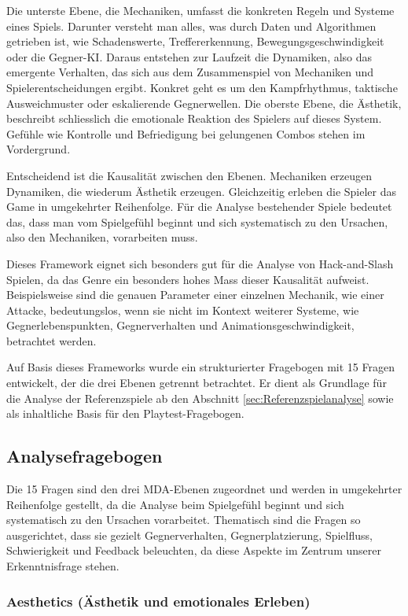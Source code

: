 \documentclass[../Main.tex]{subfiles}
\begin{document}
Die unterste Ebene, die Mechaniken, umfasst die konkreten Regeln und Systeme eines Spiels. Darunter versteht man alles, was durch Daten und Algorithmen getrieben ist, wie Schadenswerte, Treffererkennung, Bewegungsgeschwindigkeit oder die Gegner-KI. Daraus entstehen zur Laufzeit die Dynamiken, also das emergente Verhalten, das sich aus dem Zusammenspiel von Mechaniken und Spielerentscheidungen ergibt. Konkret geht es um den Kampfrhythmus, taktische Ausweichmuster oder eskalierende Gegnerwellen. Die oberste Ebene, die Ästhetik, beschreibt schliesslich die emotionale Reaktion des Spielers auf dieses System. Gefühle wie Kontrolle und Befriedigung bei gelungenen Combos stehen im Vordergrund.

Entscheidend ist die Kausalität zwischen den Ebenen. Mechaniken erzeugen Dynamiken, die wiederum Ästhetik erzeugen. Gleichzeitig erleben die Spieler das Game in umgekehrter Reihenfolge. Für die Analyse bestehender Spiele bedeutet das, dass man vom Spielgefühl beginnt und sich systematisch zu den Ursachen, also den Mechaniken, vorarbeiten muss.

Dieses Framework eignet sich besonders gut für die Analyse von Hack-and-Slash Spielen, da das Genre ein besonders hohes Mass dieser Kausalität aufweist. Beispielsweise sind die genauen Parameter einer einzelnen Mechanik, wie einer Attacke, bedeutungslos, wenn sie nicht im Kontext weiterer Systeme, wie Gegnerlebenspunkten, Gegnerverhalten und Animationsgeschwindigkeit, betrachtet werden.\autocite{hunicke2004mda}

Auf Basis dieses Frameworks wurde ein strukturierter Fragebogen mit 15 Fragen entwickelt, der die drei Ebenen getrennt betrachtet. Er dient als Grundlage für die Analyse der Referenzspiele ab den Abschnitt \ref{sec:Referenzspielanalyse} sowie als inhaltliche Basis für den Playtest-Fragebogen.


\subsection{Analysefragebogen}

Die 15 Fragen sind den drei MDA-Ebenen zugeordnet und werden in umgekehrter Reihenfolge gestellt, da die Analyse beim Spielgefühl beginnt und sich systematisch zu den Ursachen vorarbeitet. Thematisch sind die Fragen so ausgerichtet, dass sie gezielt Gegnerverhalten, Gegnerplatzierung, Spielfluss, Schwierigkeit und Feedback beleuchten, da diese Aspekte im Zentrum unserer Erkenntnisfrage stehen.

\subsubsection{Aesthetics (Ästhetik und emotionales Erleben)}
\end{document}
